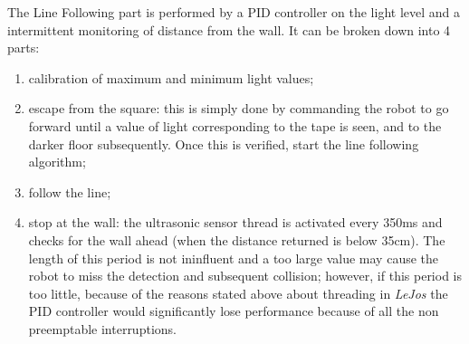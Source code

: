 \documentclass[a4paper,11pt,oneside]{book}
\begin{document}
			The Line Following part is performed by a PID controller on the light level and a intermittent monitoring of distance from the wall. It can be broken down into 4 parts:
			\begin{enumerate}
				\item calibration of maximum and minimum light values;
				\item escape from the square: this is simply done by commanding the robot to go forward until a value of light corresponding to the tape is seen, and to the darker floor subsequently. Once this is verified, start the line following algorithm;
				\item follow the line;
				\item stop at the wall: the ultrasonic sensor thread is activated every 350ms and checks for the wall ahead (when the distance returned is below 35cm). The length of this period is not ininfluent and a too large value may cause the robot to miss the detection and subsequent collision; however, if this period is too little, because of the reasons stated above about threading in \textit{LeJos} the PID controller would significantly lose performance because of all the non preemptable interruptions.
			\end{enumerate} 
		
\end{document}
